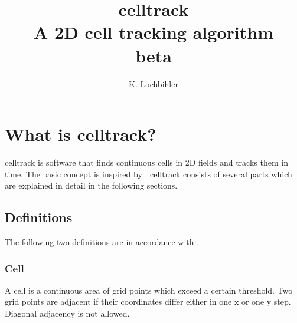 \documentclass{scrartcl}
\title{celltrack\\
	A 2D cell tracking algorithm\\ \medskip
	beta}
\author{K. Lochbihler}
\begin{document}
	
\maketitle

\section{What is celltrack?}
celltrack is software that finds continuous cells in 2D fields and tracks them in time. The basic concept is inspired by \cite{moseley2013}. celltrack consists of several parts which are explained in detail in the following sections.

\subsection{Definitions}
The following two definitions are in accordance with \cite{moseley2013}.

\subsubsection*{Cell}
A cell is a continuous area of grid points which exceed a certain threshold. Two grid points are adjacent if their coordinates differ either in one x or one y step. Diagonal adjacency is not allowed.
\end{document}
